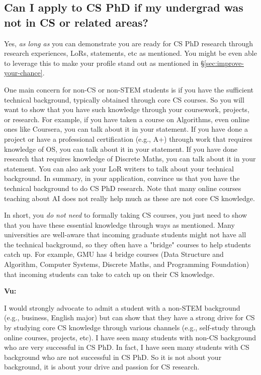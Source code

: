 \documentclass[11pt]{article}
\newenvironment{commentbox}[1][]{
\small
    \begin{cbox}
    \textbf{#1} 
 }{
   \end{cbox}
}
\begin{document}
\subsection{Can I apply to CS PhD if my undergrad was not in CS or related areas?}

Yes, \emph{as long as} you can demonstrate you are ready for CS PhD research through research experiences, LoRs, statements, etc as mentioned. You might be even able to leverage this to make your profile stand out as mentioned in \S\ref{sec:improve-your-chance}. 

One main concern for non-CS or non-STEM students is if you have the sufficient technical background, typically obtained through core CS courses.  So you will want to show that you have such knowledge through your coursework, projects, or research. 
For example, if you have taken a course on Algorithms, even online ones like Coursera, you can talk about it in your statement.  If you have done a project or have a professional certification (e.g., A+) through work that requires knowledge of OS, you can talk about it in your statement.  If you have done research that requires knowledge of Discrete Maths, you can talk about it in your statement.  You can also ask your LoR writers to talk about your technical background.  
In summary, in your application, convince us that you have the technical background to do CS PhD research. 
Note that many online courses teaching about AI does not really help much as these are not core CS knowledge.

In short, you \emph{do not need} to formally taking CS courses, you just need to show that you have these essential knowledge through ways as mentioned. Many universities are well-aware that incoming graduate students might not have all the technical background, so they often have a "bridge" courses to help students catch up.  For example, GMU has 4 bridge courses (Data Structure and Algorithm, Computer Systems, Discrete Maths, and Programming Foundation) that incoming students can take to catch up on their CS knowledge.

\begin{commentbox}[Vu:]
    I would strongly advocate to admit a student with a non-STEM background (e.g., business, English major) but can show that they have a strong drive for CS by studying core CS knowledge through various channels (e.g., self-study through online courses, projects, etc).  I have seen many students with non-CS background who are very successful in CS PhD.  In fact, I have seen many students with CS background who are not successful in CS PhD.  So it is not about your background, it is about your drive and passion for CS research.    \end{commentbox}
\end{document}

